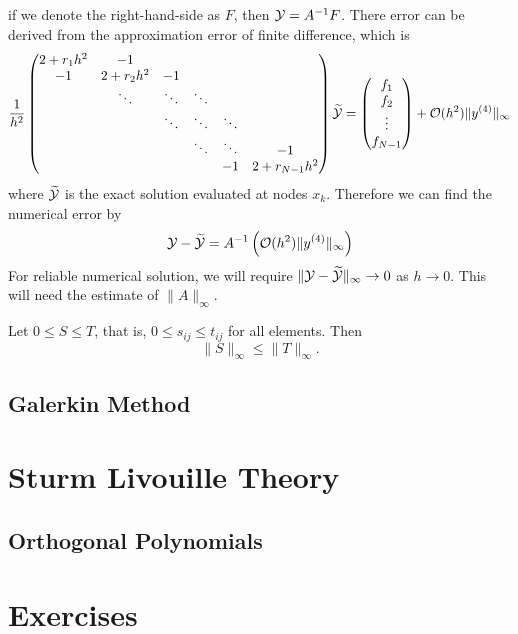 if we denote the right-hand-side as $F$, then $\mathcal Y = A^{-1} F$. There error can be derived from the approximation error of finite difference, which is 
\begin{equation}
    \frac{1}{h^2}\begin{pmatrix}
        2 + r_1h^2 & - 1 &&&&\\
        -1 & 2 + r_2 h^2 & -1 &&&\\
        &\ddots &\ddots & \ddots && \\ 
        & &\ddots &\ddots & \ddots & \\ 
        & &&\ddots & \ddots & -1 \\
        &&&& -1 & 2 + r_{N-1} h^2  
    \end{pmatrix} \widetilde{ \mathcal Y} = \begin{pmatrix}
        f_1\\f_2\\\vdots \\ f_{N-1}
    \end{pmatrix}  + \mathcal O(h^2)\|y^{(4)}\|_{\infty}
\end{equation}
where $\widetilde{\mathcal Y}$ is the exact solution evaluated at nodes $x_k$. Therefore we can find the numerical error by 
\begin{equation}
    \mathcal Y - \widetilde{\mathcal Y} = A^{-1} \left(   \mathcal O(h^2) \|y^{(4)}\|_{\infty} \right)
\end{equation}
For reliable numerical solution, we will require $\|\mathcal Y - \widetilde{\mathcal Y}\|_{\infty}\to 0$ as $h\to 0$. This will need the estimate of $\|A\|_{\infty}$.
\begin{lemma}
    Let $0\le S \le T$, that is, $0\le s_{ij}\le t_{ij}$ for all elements. Then $$\|S\|_{\infty}\le \|T\|_{\infty}.$$
\end{lemma}





\subsection{Galerkin Method}

\section{Sturm Livouille Theory}
\subsection{Orthogonal Polynomials}
\label{SSec: 5-Ort-Pol}
\section{Exercises}
